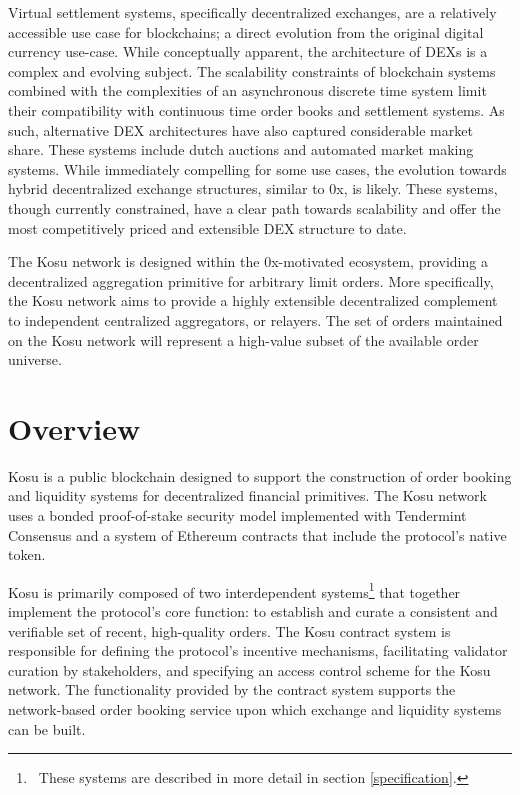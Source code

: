 \documentclass[10pt]{article}
\begin{document}
Virtual settlement systems, specifically decentralized exchanges, are a relatively accessible use case for blockchains; a direct evolution from the original digital currency use-case. While conceptually apparent, the architecture of DEXs is a complex and evolving subject. The scalability constraints of blockchain systems combined with the complexities of an asynchronous discrete time system limit their compatibility with continuous time order books and settlement systems\cite{flash-boys-2}. As such, alternative DEX architectures have also captured considerable market share. These systems include dutch auctions and automated market making systems. While immediately compelling for some use cases, the evolution towards hybrid decentralized exchange structures, similar to 0x, is likely. These systems, though currently constrained, have a clear path towards scalability and offer the most competitively priced and extensible DEX structure to date\cite{0x-roadmap-pt-2}. 
\medskip

The Kosu network is designed within the 0x-motivated ecosystem, providing a decentralized aggregation primitive for arbitrary limit orders. More specifically, the Kosu network aims to provide a highly extensible decentralized complement to independent centralized aggregators, or relayers. The set of orders maintained on the Kosu network will represent a high-value subset of the available order universe.
\clearpage
\pagebreak


\section{Overview}\label{overview}
Kosu is a public blockchain designed to support the construction of order booking and liquidity systems for decentralized financial primitives. The Kosu network uses a bonded proof-of-stake security model implemented with Tendermint Consensus\cite{tendermint} and a system of Ethereum contracts that include the protocol’s native token.
\medskip

Kosu is primarily composed of two interdependent systems\footnote{\ These systems are described in more detail in section \ref{specification}.} that together implement the protocol’s core function: to establish and curate a consistent and verifiable set of recent, high-quality orders. The Kosu contract system is responsible for defining the protocol's incentive mechanisms, facilitating validator curation by stakeholders, and specifying an access control scheme for the Kosu network. The functionality provided by the contract system supports the network-based order booking service upon which exchange and liquidity systems can be built.
\medskip
\end{document}
